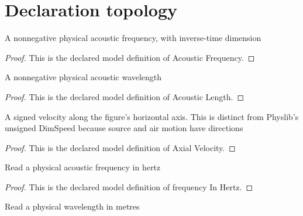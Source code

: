 \section{Declaration topology}
\begin{definition}
  \label{def:physics:phyx-mini-0193:phyxminiproblems-problemphyxmini0193-acousticfrequency}
  A nonnegative physical acoustic frequency, with inverse-time dimension
\end{definition}
\begin{proof}
  This is the declared model definition of Acoustic Frequency.
\end{proof}
\begin{definition}
  \label{def:physics:phyx-mini-0193:phyxminiproblems-problemphyxmini0193-acousticlength}
  A nonnegative physical acoustic wavelength
\end{definition}
\begin{proof}
  This is the declared model definition of Acoustic Length.
\end{proof}
\begin{definition}
  \label{def:physics:phyx-mini-0193:phyxminiproblems-problemphyxmini0193-axialvelocity}
  A signed velocity along the figure's horizontal axis. This is distinct from Physlib's unsigned DimSpeed because source and air motion have directions
\end{definition}
\begin{proof}
  This is the declared model definition of Axial Velocity.
\end{proof}
\begin{definition}
  \label{def:physics:phyx-mini-0193:phyxminiproblems-problemphyxmini0193-frequencyinhertz}
  Read a physical acoustic frequency in hertz
\end{definition}
\begin{proof}
  This is the declared model definition of frequency In Hertz.
\end{proof}
\begin{definition}
  \label{def:physics:phyx-mini-0193:phyxminiproblems-problemphyxmini0193-lengthinmeters}
  Read a physical wavelength in metres
\end{definition}
